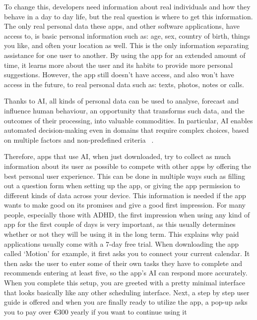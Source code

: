 \documentclass[english]{hogent-article}
\begin{document}
To change this, developers need information about real individuals and how they behave in a day to day life, but the real question is where to get this information. 
The only real personal data these apps, and other software applications, have access to, is basic personal information such as: age, sex, country of birth, things you like, and often your location as well. This is the only information separating assistance for one user to another. By using the app for an extended amount of time, it learns more about the user and its habits to provide more personal suggestions. However, the app still doesn't have access, and also won’t have access in the future,  to real personal data such as: texts, photos, notes or calls.

Thanks to AI, all kinds of personal data can be used to analyse, forecast and influence human behaviour, an opportunity that transforms such data, and the outcomes of their processing, into valuable commodities. In particular, AI enables automated decision-making even in domains that require complex choices, based on multiple factors and non-predefined criteria ~\autocite{Sartor2020}.

Therefore, apps that use AI, when just downloaded, try to collect as much information about its user as possible to compete with other apps by offering the best personal user experience. This can be done in multiple ways such as filling out a question form when setting up the app, or giving the app permission to different kinds of data across your device. This information is needed if the app wants to make good on its promises and give a good first impression. For many people, especially those with ADHD, the first impression when using any kind of app for the first couple of days is very important, as this usually determines whether or not they will be using it in the long term. This explains why paid applications usually come with a 7-day free trial. When downloading the app called ‘Motion’ for example, it first asks you to connect your current calendar. It then asks the user to enter some of their own tasks they have to complete and recommends entering at least five, so the app’s AI can respond more accurately. When you complete this setup, you are greeted with a pretty minimal interface that looks basically like any other scheduling interface. Next, a step by step user guide is offered and when you are finally ready to utilize the app, a pop-up asks you to pay over €300 yearly if you want to continue using it
\end{document}

